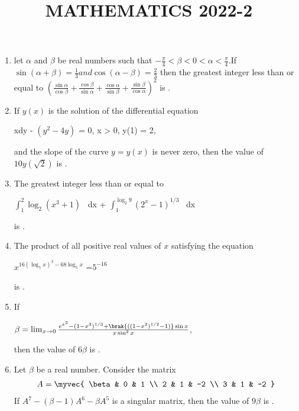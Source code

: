 \documentclass{article}
\begin{document}
\title{MATHEMATICS 2022-2}
\maketitle
\begin{enumerate}  
	\item let $\alpha$ and $\beta$ be real numbers such that $-\frac{\pi}{4} < \beta < 0 < \alpha < \frac{\pi}{4}$.If $\sin(\alpha + \beta) = \frac{1}{3} and \cos(\alpha - \beta) = \frac{2}{3}$
		then the greatest integer less than or equal to  $({\frac{\sin \alpha}{\cos \beta} + \frac{\cos \beta}{\sin \alpha} + \frac{\cos \alpha}{\sin \beta} + \frac{\sin \beta}{\cos \alpha}})	^2$
is \underline{   }.



\item If $ y(x) $ is the solution of the differential equation  

xdy - $(y^2 - 4y)$ = 0, \quad {} x > 0, \quad y(1) = 2,

and the slope of the curve $ y = y(x) $ is never zero, then the value of $ 10 y(\sqrt{2}) $ is \underline{   }. 





\item The greatest integer less than or equal to  

$\int_{1}^{2} \log_2 (x^3 + 1)$ \, dx + $\int_{1}^{\log_2 9} (2^x - 1)^{1/3}$ \, dx

is \underline{   }.



\item The product of all positive real values of $x$ satisfying the equation  
	
$x^{16(\log_5 x)^3 - 68 \log_5 x}$ =$ 5^{-16}$
	
is \underline{   }.



\item If 
		
		$\beta = \lim_{x \to 0} \frac{e^{x^3} - (1 - x^3)^{1/3} + \brak{( (1 - x^2)^{1/2} - 1 )} \sin x}{x \sin^2 x}$,
	
then the value of $6\beta$ is \underline{   }.



\item Let $\beta$ be a real number. Consider the matrix  
	\begin{align}
		A = \myvec{ 
\beta & 0 & 1 \\ 
2 & 1 & -2 \\ 
3 & 1 & -2 
		}
	\end{align}
If $A^7 - (\beta - 1) A^6 - \beta A^5$ is a singular matrix, then the value of $9\beta$ is \underline{   }.




\end{enumerate}
\end{document}
